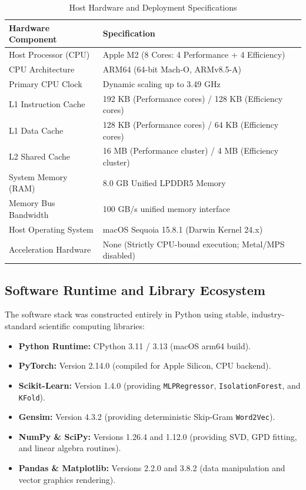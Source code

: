 \begin{table}[htbp]
\centering
\caption{Host Hardware and Deployment Specifications}
\label{tab:hardware_specs}
\begin{tabular}{ll}
\toprule
\textbf{Hardware Component} & \textbf{Specification} \\
\midrule
Host Processor (CPU) & Apple M2 (8 Cores: 4 Performance + 4 Efficiency) \\
CPU Architecture & ARM64 (64-bit Mach-O, ARMv8.5-A) \\
Primary CPU Clock & Dynamic scaling up to 3.49 GHz \\
L1 Instruction Cache & 192 KB (Performance cores) / 128 KB (Efficiency cores) \\
L1 Data Cache & 128 KB (Performance cores) / 64 KB (Efficiency cores) \\
L2 Shared Cache & 16 MB (Performance cluster) / 4 MB (Efficiency cluster) \\
System Memory (RAM) & 8.0 GB Unified LPDDR5 Memory \\
Memory Bus Bandwidth & 100 GB/s unified memory interface \\
Host Operating System & macOS Sequoia 15.8.1 (Darwin Kernel 24.x) \\
Acceleration Hardware & None (Strictly CPU-bound execution; Metal/MPS disabled) \\
\bottomrule
\end{tabular}
\end{table}

\subsection{Software Runtime and Library Ecosystem}
The software stack was constructed entirely in Python using stable, industry-standard scientific computing libraries:
\begin{itemize}
    \item \textbf{Python Runtime:} CPython 3.11 / 3.13 (macOS arm64 build).
    \item \textbf{PyTorch:} Version 2.14.0 (compiled for Apple Silicon, CPU backend).
    \item \textbf{Scikit-Learn:} Version 1.4.0 (providing \texttt{MLPRegressor}, \texttt{IsolationForest}, and \texttt{KFold}).
    \item \textbf{Gensim:} Version 4.3.2 (providing deterministic Skip-Gram \texttt{Word2Vec}).
    \item \textbf{NumPy \& SciPy:} Versions 1.26.4 and 1.12.0 (providing SVD, GPD fitting, and linear algebra routines).
    \item \textbf{Pandas \& Matplotlib:} Versions 2.2.0 and 3.8.2 (data manipulation and vector graphics rendering).
\end{itemize}

